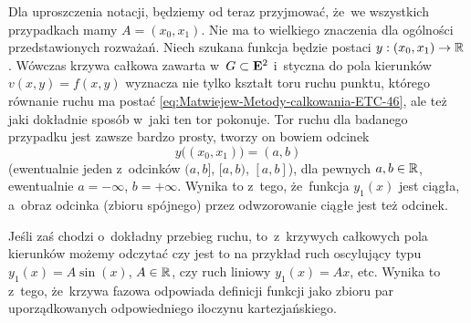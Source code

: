 \documentclass[a4paper,11pt]{article}
\numberwithin{equation}{section}
\begin{document}
Dla uproszczenia notacji, będziemy od teraz przyjmować, że~we wszystkich
przypadkach mamy $A = ( x_{ 0 }, x_{ 1 } )$. Nie ma to wielkiego znaczenia
dla ogólności przedstawionych rozważań. Niech szukana funkcja będzie postaci
$y : ( x_{ 0 }, x_{ 1 } ) \to \mathbb{R}$. Wówczas krzywa całkowa
zawarta w~$G \subset \mathbf{E}^{ 2 }$ i~styczna do pola kierunków
$v( x, y ) = f( x, y )$ wyznacza nie tylko kształt toru ruchu punktu,
którego równanie ruchu ma postać
\eqref{eq:Matwiejew-Metody-calkowania-ETC-46},
ale też jaki dokładnie sposób w~jaki ten tor pokonuje. Tor ruchu dla
badanego przypadku jest zawsze bardzo prosty, tworzy on bowiem odcinek
\begin{equation}
  \label{eq:Uwagi-do-konkrentych-stron-29}
  y\big( ( x_{ 0 }, x_{ 1 } ) \big) = ( a, b )
\end{equation}
 (ewentualnie jeden z~odcinków
$( a, b ]$, $[ a, b )$, $[ a, b ]$), dla pewnych $a, b \in \mathbb{R}$,
ewentualnie $a = -\infty$, $b = +\infty$. Wynika to z~tego, że~funkcja $y_{ 1 }( x )$
jest ciągła, a~obraz odcinka (zbioru spójnego) przez odwzorowanie ciągłe
jest też odcinek.

Jeśli zaś chodzi o~dokładny przebieg ruchu, to~z~krzywych całkowych pola
kierunków możemy odczytać czy jest to na przykład ruch oscylujący typu
$y_{ 1 }( x ) = A \sin( x )$, $A \in \mathbb{R}$, czy ruch liniowy
$y_{ 1 }( x ) = A x$, etc. Wynika to z~tego, że~krzywa fazowa odpowiada
definicji funkcji jako zbioru par uporządkowanych odpowiedniego iloczynu
kartezjańskiego.
\end{document}
